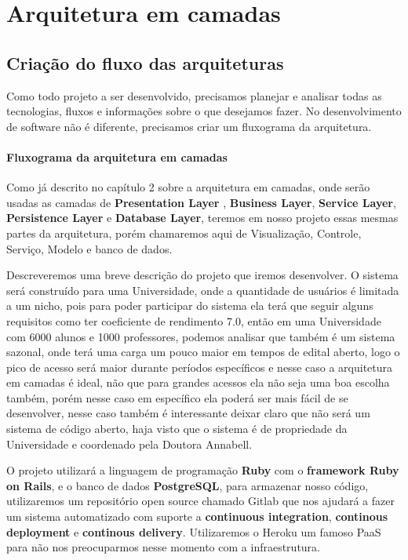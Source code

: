 
\chapter{Arquitetura em camadas}\label{cap5}

\section{Criação do fluxo das arquiteturas}

Como todo projeto a ser desenvolvido, precisamos planejar e analisar todas as tecnologias, fluxos e informações sobre o que desejamos fazer. No desenvolvimento de software não é diferente, precisamos criar um fluxograma da arquitetura.

\subsubsection{Fluxograma da arquitetura em camadas}

Como já descrito no capítulo 2 sobre a arquitetura em camadas, onde serão usadas as camadas de \textbf{Presentation Layer} , \textbf{Business Layer}, \textbf{Service Layer}, \textbf{Persistence Layer} e \textbf{Database Layer}, teremos em nosso projeto essas mesmas partes da arquitetura, porém chamaremos aqui de Visualização, Controle, Serviço, Modelo e banco de dados. 

Descreveremos uma breve descrição do projeto que iremos desenvolver. O sistema será construído para uma Universidade, onde a quantidade de usuários é limitada a um nicho, pois para poder participar do sistema ela terá que seguir alguns requisitos como ter coeficiente de rendimento 7.0, então em uma Universidade com 6000 alunos e 1000 professores, podemos analisar que também é um sistema sazonal, onde terá uma carga um pouco maior em tempos de edital aberto, logo o pico de acesso será maior durante períodos específicos e nesse caso a arquitetura em camadas é ideal, não que para grandes acessos ela não seja uma boa escolha também, porém nesse caso em específico ela poderá ser mais fácil de se desenvolver, nesse caso também é interessante deixar claro que não será um sistema de código aberto, haja visto que o sistema é de propriedade da Universidade e coordenado pela Doutora Annabell. 

O projeto utilizará a linguagem de programação \textbf{Ruby} com o \textbf{framework Ruby on Rails}, e o banco de dados \textbf{PostgreSQL}, para armazenar nosso código, utilizaremos um repositório open source chamado Gitlab que nos ajudará a fazer um sistema automatizado com suporte a \textbf{continuous integration}, \textbf{continous deployment} e \textbf{continous delivery}. Utilizaremos o Heroku um famoso PaaS para não nos preocuparmos nesse momento com a infraestrutura.

